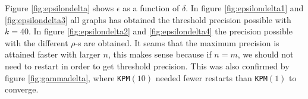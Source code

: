 Figure \ref{fig:epsilondelta} shows $\epsilon$ as a function of $\delta$. In figure \ref{fig:epsilondelta1} and \ref{fig:epsilondelta3} all graphs has obtained the threshold precision possible with $k=40$. In
figure \ref{fig:epsilondelta2} and \ref{fig:epsilondelta4} the precision possible with the different $\rho$-s are obtained. It seams that the maximum precision is attained faster with larger $n$, this makes sense because if $n = m$, we should not need to restart in order to get threshold precision. This was also confirmed by figure \ref{fig:gammadelta}, where \texttt{KPM}$(10)$ needed fewer restarts than \texttt{KPM}$(1)$ to converge. 
